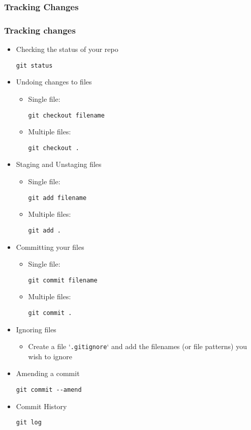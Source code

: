 \documentclass[10pt,t,sans,mathsans,xcolor=dvipsnames]{beamer}
\begin{document}
\subsubsection*{Tracking Changes}
\begin{frame}
\frametitle{Tracking changes}
\begin{itemize}
\item Checking the status of your repo
\begin{lstlisting}
git status
\end{lstlisting}
\item Undoing changes to files
\begin{itemize}
\item Single file:
\begin{lstlisting}
git checkout filename
\end{lstlisting}
\item Multiple files:
\begin{lstlisting}
git checkout .
\end{lstlisting}
\end{itemize}
\item Staging and Unstaging files
\begin{itemize}
\item Single file:
\begin{lstlisting}
git add filename
\end{lstlisting}
\item Multiple files:
\begin{lstlisting}
git add .
\end{lstlisting}
\end{itemize}
\item Committing your files
\begin{itemize}
\item Single file:
\begin{lstlisting}
git commit filename
\end{lstlisting}
\item Multiple files:
\begin{lstlisting}
git commit .
\end{lstlisting}
\end{itemize}
\item Ignoring files
\begin{itemize}
\item Create a file `\texttt{.gitignore}` and add the filenames (or file patterns) you wish to ignore
\end{itemize}
\item Amending a commit
\begin{lstlisting}
git commit --amend
\end{lstlisting}
\item Commit History
\begin{lstlisting}
git log
\end{lstlisting}
\end{itemize}
\end{frame}
\end{document}
